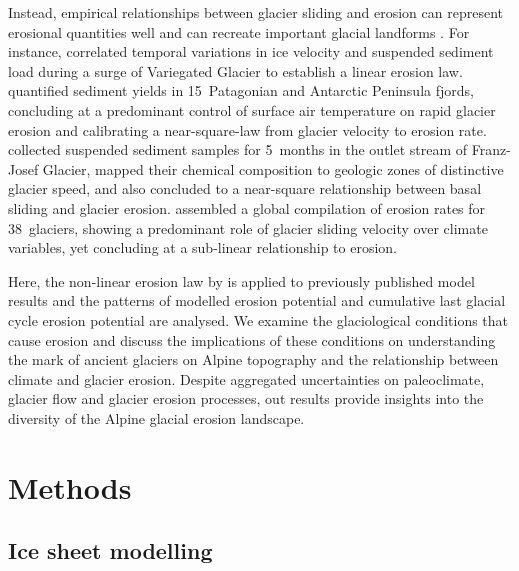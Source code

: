 \documentclass[esurf, manuscript]{copernicus}
\begin{document}
    Instead, empirical relationships between glacier sliding and erosion can
    represent erosional quantities well and can recreate important glacial
    landforms \citep[e.g.,][]{Harbor.etal.1988, Macgregor.etal.2000}.
    For instance, \citet{Humphrey.Raymond.1994} correlated temporal variations
    in ice velocity and suspended sediment load during a surge of Variegated
    Glacier to establish a linear erosion law.
    \citet{Koppes.etal.2015} quantified sediment
    yields in 15~Patagonian and Antarctic Peninsula fjords, concluding at a
    predominant control of surface air temperature on rapid glacier erosion and
    calibrating a near-square-law from glacier velocity to erosion rate.
    \citet{Herman.etal.2015} collected suspended sediment samples for 5~months
    in the outlet stream of Franz-Josef Glacier, mapped their chemical
    composition to geologic zones of distinctive glacier speed, and also
    concluded to a near-square relationship between basal sliding and glacier
    erosion.
    \citet{Cook.etal.2020} assembled a global compilation of erosion rates for
    38~glaciers, showing a predominant role of glacier sliding velocity over
    climate variables, yet concluding at a sub-linear relationship to erosion.

    Here, the non-linear erosion law by \citet{Koppes.etal.2015} is applied to
    previously published model results \citep{Seguinot.etal.2018} and the
    patterns of modelled erosion potential and cumulative last glacial cycle
    erosion potential are analysed. We examine the glaciological conditions
    that cause erosion and discuss the implications of these conditions on
    understanding the mark of ancient glaciers on Alpine topography and
    the relationship between climate and glacier erosion. Despite aggregated
    uncertainties on paleoclimate, glacier flow and glacier erosion processes,
    out results provide insights into the diversity of the Alpine glacial
    erosion landscape.


\section{Methods}

\subsection{Ice sheet modelling}
\end{document}

